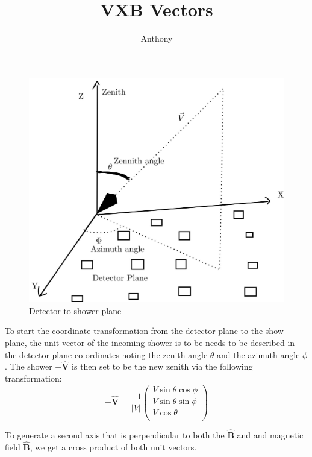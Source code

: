 \documentclass[11pt]{article}
\begin{document}
\author{Anthony}
\title{VXB Vectors}
\maketitle

\begin{figure}[h]
\centering
  \includegraphics[scale=0.2]{vvv.JPG}
  \caption{Detector to shower plane }
  \label{fig:boat1}
\end{figure}

To start the coordinate transformation from the detector plane to the show plane, the unit vector of the incoming shower is to be needs to be described in the detector plane co-ordinates noting the zenith angle $\theta$  and the azimuth angle $\phi$. The shower $\mathbf{-\hat{V}}$ is then set to be the new zenith via the following transformation:
\begin{equation}
   \mathbf{-\hat{V}} = \frac{-1}{\left|V\right|}\left(
    \begin{array}{c}
    V\sin\theta \cos\phi \\ 	
    V\sin\theta \sin\phi \\ 
    V\cos\theta \\
\end{array} 
\right)
\end{equation}

To generate a second axis that is perpendicular to both the $\mathbf{\hat{B}}$ and and magnetic field  $\mathbf{\hat{B}}$, we get a cross product of both unit vectors.
\end{document}
